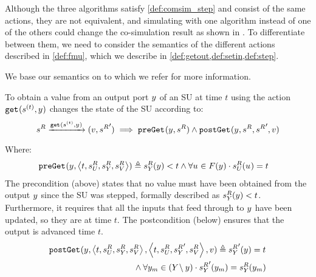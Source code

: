 Although the three algorithms satisfy \cref{def:comsim_step} and consist of the same actions, they are not equivalent, and simulating with one algorithm instead of one of the others could change the co-simulation result as shown in \cite{Gomes2019c,hansen_verification_2021}. 
To differentiate between them, we need to consider the semantics of the different actions described in \cref{def:fmu}, which we describe in \cref{def:getout,def:setin,def:step}.

We base our semantics on \cite{Gomes2019a,hansen_verification_2021} to which we refer for more information.

\begin{definition}\label{def:getout}   
  To obtain a value from an output port $y_{}$ of an SU at time $t$ using the action $\mathtt{get}_{}(s_{}^{(t)},y_{})$ changes the state of the SU according to:
  \begin{align*}
    s^{R}_{} 
    \xrightarrow[\text{}]{\mathtt{get}_{}(s_{}^{(t)}, y_{})} 
    (v,{s^{R}_{}}')
    \implies 
    \mathtt{preGet}_{}(y_{}, s^{R}_{})
    \land
    \mathtt{postGet}_{}(y_{}, s^{R}_{}, {s^{R}_{}}', v)
  \end{align*}
  Where:
  \begin{align*}
    &\mathtt{preGet}_{}(y_{},  \left\langle t,s^{R}_{U_{}}, s^{R}_{Y_{}}, s^{R}_{V} \right\rangle ) \triangleq
    s^{R}_{Y_{}}(y_{}) < t \land
    \forall u_{} \in F(y_{}) \cdot s^{R}_{U_{}}(u_{}) = t 
  \end{align*}
  The precondition (above) states that no value must have been obtained from the output $y_{}$ since the SU was stepped, formally described as $s^{R}_{Y_{}}(y_{}) < t$.
  Furthermore, it requires that all the inputs that feed through to $y_{}$ have been updated, so they are at time $t$.
  The postcondition (below) ensures that the output is advanced time $t$.
  \begin{align*}
    &\mathtt{postGet}_{}(y_{},  \left\langle t,s^{R}_{U_{}}, s^{R}_{Y_{}}, s^{R}_{V} \right\rangle , 
     \left\langle t,s^{R}_{U_{}}, {s^{R}_{Y_{}}}', s^{R}_{V} \right\rangle , v) \triangleq 
    {s^{R}_{Y_{}}}'(y_{}) = t \nonumber \\
    & \qquad \qquad \qquad \qquad \qquad 
    \land 
    \forall y_{m} \in (Y_{} \setminus y_{}) \cdot 
    {s^{R}_{Y_{}}}'(y_{m}) =
    s^{R}_{Y_{}}(y_{m})
  \end{align*}
\end{definition}

